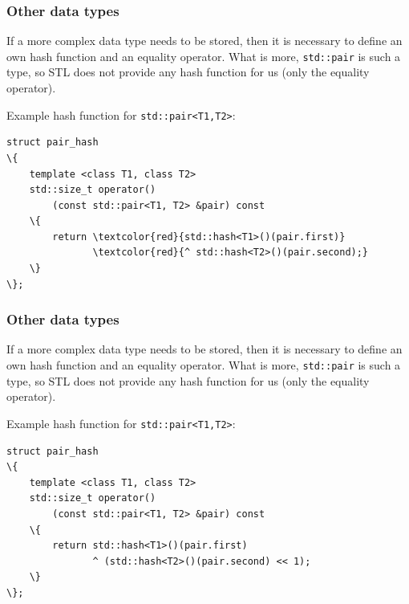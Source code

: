 \documentclass{beamer}
\begin{document}
\begin{frame}[fragile]
    \frametitle{Other data types}

    If a more complex data type needs to be stored, then it is necessary
    to define an own hash function and an equality operator. What is more,
    \texttt{std::pair} is such a type, so STL does not provide any hash function
    for us (only the equality operator).

    Example hash function for \texttt{std::pair<T1,T2>}:
    \begin{Verbatim}[commandchars=\\\{\},fontsize=\small]
struct pair_hash
\{
    template <class T1, class T2>
    std::size_t operator()
        (const std::pair<T1, T2> &pair) const
    \{
        return \textcolor{red}{std::hash<T1>()(pair.first)}
               \textcolor{red}{^ std::hash<T2>()(pair.second);}
    \}
\};
\end{Verbatim}
\end{frame}

\begin{frame}[fragile]
    \frametitle{Other data types}

    If a more complex data type needs to be stored, then it is necessary
    to define an own hash function and an equality operator. What is more,
    \texttt{std::pair} is such a type, so STL does not provide any hash function
    for us (only the equality operator).

    Example hash function for \texttt{std::pair<T1,T2>}:
    \begin{Verbatim}[commandchars=\\\{\},fontsize=\small]
struct pair_hash
\{
    template <class T1, class T2>
    std::size_t operator()
        (const std::pair<T1, T2> &pair) const
    \{
        return std::hash<T1>()(pair.first)
               ^ (std::hash<T2>()(pair.second) << 1);
    \}
\};
\end{Verbatim}
\end{frame}
\end{document}
